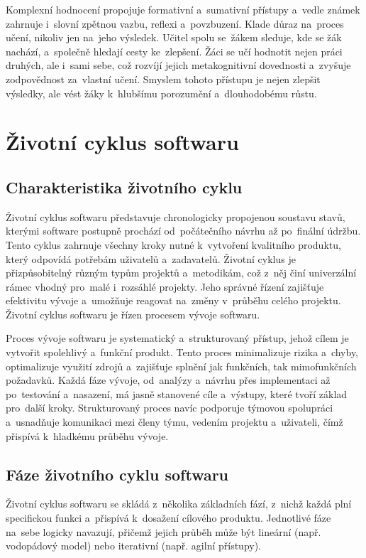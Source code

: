 \documentclass[male,czech,api_bc]{kitheses}
\begin{document}
Komplexní hodnocení propojuje formativní a~sumativní přístupy a~vedle známek zahrnuje i~slovní zpětnou vazbu, reflexi a~povzbuzení. Klade důraz na~proces učení, nikoliv jen na~jeho výsledek. Učitel spolu se~žákem sleduje, kde se žák nachází, a~společně hledají cesty ke~zlepšení. Žáci se učí hodnotit nejen práci druhých, ale i~sami sebe, což rozvíjí jejich metakognitivní dovednosti a~zvyšuje zodpovědnost za~vlastní učení. Smyslem tohoto přístupu je nejen zlepšit výsledky, ale vést žáky k~hlubšímu porozumění a~dlouhodobému růstu.


\section{Životní cyklus softwaru}

\subsection{Charakteristika životního cyklu}

Životní cyklus softwaru představuje chronologicky propojenou soustavu stavů, kterými software postupně prochází od~počátečního návrhu až po~finální údržbu. Tento cyklus zahrnuje všechny kroky nutné k~vytvoření kvalitního produktu, který odpovídá potřebám uživatelů a~zadavatelů. Životní cyklus je přizpůsobitelný různým typům projektů a~metodikám, což z~něj činí univerzální rámec vhodný pro~malé i~rozsáhlé projekty. Jeho správné řízení zajišťuje efektivitu vývoje a~umožňuje reagovat na~změny v~průběhu celého projektu. Životní cyklus softwaru je řízen procesem vývoje softwaru.

Proces vývoje softwaru je systematický a~strukturovaný přístup, jehož cílem je vytvořit spolehlivý a~funkční produkt. Tento proces minimalizuje rizika a~chyby, optimalizuje využití zdrojů a~zajišťuje splnění jak funkčních, tak mimofunkčních požadavků. Každá fáze vývoje, od~analýzy a~návrhu přes implementaci až po~testování a~nasazení, má jasně stanovené cíle a~výstupy, které tvoří základ pro~další kroky. Strukturovaný proces navíc podporuje týmovou spolupráci a~usnadňuje komunikaci mezi členy týmu, vedením projektu a~uživateli, čímž přispívá k~hladkému průběhu vývoje.

\subsection{Fáze životního cyklu softwaru}

Životní cyklus softwaru se skládá z~několika základních fází, z~nichž každá plní specifickou funkci a~přispívá k~dosažení cílového produktu. Jednotlivé fáze na~sebe logicky navazují, přičemž jejich průběh může být lineární (např. vodopádový model) nebo iterativní (např. agilní přístupy).
\end{document}
